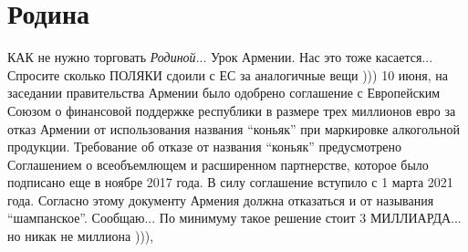  
 
 
 
 
\chapter{Родина}

КАК не нужно торговать \emph{Родиной}...  Урок Армении. Нас это тоже
касается... Спросите сколько ПОЛЯКИ сдоили с ЕС за аналогичные вещи ))) 10
июня, на заседании правительства Армении было одобрено соглашение с Европейским
Союзом о финансовой поддержке республики в размере трех миллионов евро за отказ
Армении от использования названия \enquote{коньяк} при маркировке алкогольной
продукции.  Требование об отказе от названия \enquote{коньяк} предусмотрено Соглашением
о всеобъемлющем и расширенном партнерстве, которое было подписано еще в ноябре
2017 года. В силу соглашение вступило с 1 марта 2021 года.  Согласно этому
документу Армения должна отказаться и от называния \enquote{шампанское}.  Сообщаю... По
минимуму такое решение стоит 3 МИЛЛИАРДА... но никак не миллиона ))),
